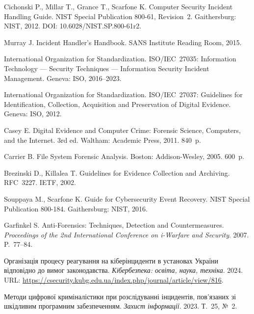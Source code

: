 
 Cichonski P., Millar T., Grance T., Scarfone K. Computer Security Incident Handling Guide. NIST Special Publication 800-61, Revision~2. Gaithersburg: NIST, 2012. DOI: 10.6028/NIST.SP.800-61r2.

 Murray J. Incident Handler's Handbook. SANS Institute Reading Room, 2015.

 International Organization for Standardization. ISO/IEC~27035: Information Technology --- Security Techniques --- Information Security Incident Management. Geneva: ISO, 2016--2023.

 International Organization for Standardization. ISO/IEC~27037: Guidelines for Identification, Collection, Acquisition and Preservation of Digital Evidence. Geneva: ISO, 2012.

 Casey E. Digital Evidence and Computer Crime: Forensic Science, Computers, and the Internet. 3rd ed. Waltham: Academic Press, 2011. 840~p.

 Carrier B. File System Forensic Analysis. Boston: Addison-Wesley, 2005. 600~p.

 Brezinski D., Killalea T. Guidelines for Evidence Collection and Archiving. RFC~3227. IETF, 2002.

 Souppaya M., Scarfone K. Guide for Cybersecurity Event Recovery. NIST Special Publication 800-184. Gaithersburg: NIST, 2016.

 Garfinkel S. Anti-Forensics: Techniques, Detection and Countermeasures. \emph{Proceedings of the 2nd International Conference on i-Warfare and Security}. 2007. P.~77--84.

 Організація процесу реагування на кіберінциденти в установах України відповідно до вимог законодавства. \emph{Кібербезпека: освіта, наука, техніка}. 2024. URL: \url{https://csecurity.kubg.edu.ua/index.php/journal/article/view/816}.

 Методи цифрової криміналістики при розслідуванні інцидентів, пов'язаних зі шкідливим програмним забезпеченням. \emph{Захист інформації}. 2023. Т.~25, №~2.
